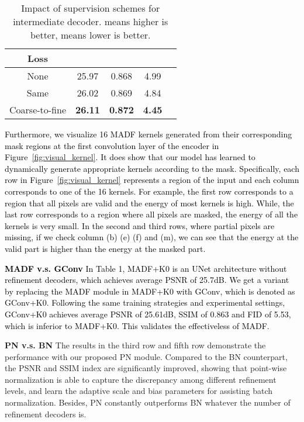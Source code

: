 \documentclass[journal]{IEEEtran}
\begin{document}
\begin{table}[t]
\caption{Impact of supervision schemes for intermediate decoder.  means higher is better,  means lower is better.
}
\label{tb:losses_effect}
\centering
\begin{tabular}{ccccc} \hline
Loss &   &  &  	\\ \hline
\hline 
None   & 25.97 & 0.868  & 4.99 \\
Same 	& 26.02 & 0.869 & 4.84 \\
Coarse-to-fine   & \textbf{26.11} & \textbf{0.872} & \textbf{4.45} \\
\hline
\end{tabular}

\end{table}
\textcolor{black}{  
Furthermore, we visualize 16  MADF kernels generated from their corresponding mask regions at the first convolution layer of the encoder in Figure~\ref{fig:visual_kernel}. It does show that our model has learned to dynamically generate appropriate kernels according to the mask. Specifically, each row in Figure~\ref{fig:visual_kernel} represents a region of the input and each column corresponds to one of the 16 kernels. For example, the first row corresponds to a region that all pixels are valid and the energy of most kernels is high. While, the last row corresponds to a region where all pixels are masked, the energy of all the kernels is very small. In the second and third rows, where partial pixels are missing, if we check column (b) (e) (f) and (m), we can see that the energy at the valid part is higher than the energy at the masked part.  
}

\textcolor{black}{   
\textbf{MADF v.s. GConv}
In Table 1, MADF+K0 is an UNet architecture without refinement decoders, which achieves average PSNR of 25.7dB. 
We get a variant by replacing the MADF module in MADF+K0 with GConv, which is denoted as GConv+K0. Following the same training strategies and experimental settings, GConv+K0 achieves average PSNR of 25.61dB, SSIM of 0.863 and FID of 5.53, which is inferior to MADF+K0. This validates the effectiveless of MADF.
}

\textbf{PN v.s. BN}
The results in the third row and fifth row demonstrate the performance with our proposed PN module. Compared to the BN counterpart, the PSNR and SSIM index are significantly improved, showing that point-wise normalization is able to capture the discrepancy among different refinement levels, and learn the adaptive scale and bias parameters for assisting batch normalization.
Besides, PN constantly outperforms BN whatever the number of refinement decoders is.
\end{document}
